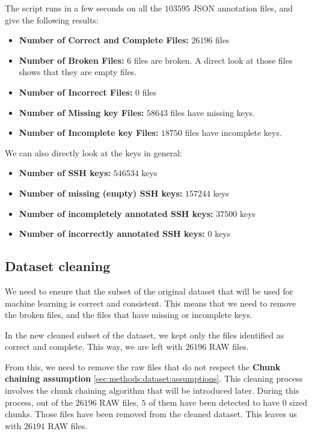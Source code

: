     The script runs in a few seconds on all the $103595$ JSON annotation files, and give the following results:

    \begin{itemize}
        \item \textbf{Number of Correct and Complete Files:} $ 26196 $ files 
        \item \textbf{Number of Broken Files:} $ 6 $ files are broken. A direct look at those files shows that they are empty files.
        \item \textbf{Number of Incorrect Files:} $ 0 $ files
        \item \textbf{Number of Missing key Files:} $ 58643 $ files have missing keys.
        \item \textbf{Number of Incomplete key Files:} $ 18750 $ files have incomplete keys.
    \end{itemize}

    We can also directly look at the keys in general:

    \begin{itemize}
        \item \textbf{Number of SSH keys:} $546534$ keys
        \item \textbf{Number of missing (empty) SSH keys:} $157244$ keys
        \item \textbf{Number of incompletely annotated SSH keys:} $37500$ keys
        \item \textbf{Number of incorrectly annotated SSH keys:} $0$ keys
    \end{itemize}

    \subsection{Dataset cleaning}\label{sec:methods:dataset:cleaning}
    We need to ensure that the subset of the original dataset that will be used for machine learning is correct and consistent. This means that we need to remove the broken files, and the files that have missing or incomplete keys. 

    In the new cleaned subset of the dataset, we kept only the files identified as correct and complete. This way, we are left with $26196$ RAW files.

    From this, we need to remove the raw files that do not respect the \textbf{Chunk chaining assumption} \ref{sec:methods:dataset:assumptions}. This cleaning process involves the chunk chaining algorithm that will be introduced later. During this process, out of the $26196$ RAW files, $ 5 $ of them have been detected to have 0 sized chunks. Those files have been removed from the cleaned dataset. This leaves us with $26191$ RAW files.

